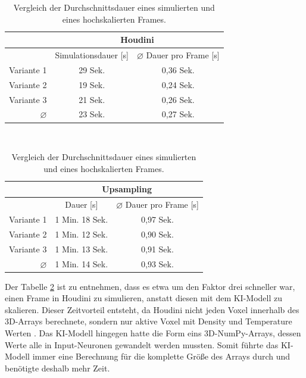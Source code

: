 \begin{table}[h]
    \centering
    \caption{Vergleich der Durchschnittsdauer eines simulierten und eines hochskalierten Frames.}
\begin{tabular}{|r|c|c|}
    
\hline
   & \multicolumn{2}{c|}{Houdini} \\
   \hline
           &  Simulationsdauer [s]       & 	$\varnothing$ Dauer pro Frame [s]\\
            \hline
Variante 1 & 29 Sek.          & 0,36 Sek.                       \\
Variante 2 & 19 Sek.          & 0,24 Sek.                      \\
Variante 3 & 21 Sek.           & 0,26 Sek.                       \\
\hline
\hline
 $\varnothing$   &     23 Sek.      &  0,27 Sek.           \\
 \hline
\end{tabular}
\vspace{0.7cm}\\
\begin{tabular}{|r|c|c|}
    
\hline
   &\multicolumn{2}{c|}{Upsampling} \\
   \hline
            & Dauer [s]      & 	$\varnothing$ Dauer pro Frame [s]        \\
            \hline
Variante 1     &  1 Min. 18 Sek.         & 0,97 Sek.             \\
Variante 2         &   1 Min. 12 Sek.        &  0,90 Sek.            \\
Variante 3          &  1 Min. 13 Sek.         &  0,91 Sek.           \\
\hline
\hline
 $\varnothing$   &    1 Min. 14 Sek.       &    0,93 Sek.    \\
 \hline
\end{tabular}

    \label{tab:speed}
\end{table}

Der Tabelle \ref{tab:speed} ist zu entnehmen, dass es etwa um den Faktor drei schneller war, einen Frame in Houdini zu simulieren, anstatt diesen mit dem KI-Modell zu skalieren. Dieser Zeitvorteil entsteht, da Houdini nicht jeden Voxel innerhalb des 3D-Arrays berechnete, sondern nur aktive Voxel mit Density und Temperature Werten \parencite{sidefxsparse}. Das KI-Modell hingegen hatte die Form eins 3D-NumPy-Arrays, dessen Werte alle in Input-Neuronen gewandelt werden mussten. Somit führte das KI-Modell immer eine Berechnung für die komplette Größe des Arrays durch und benötigte deshalb mehr Zeit.\\

